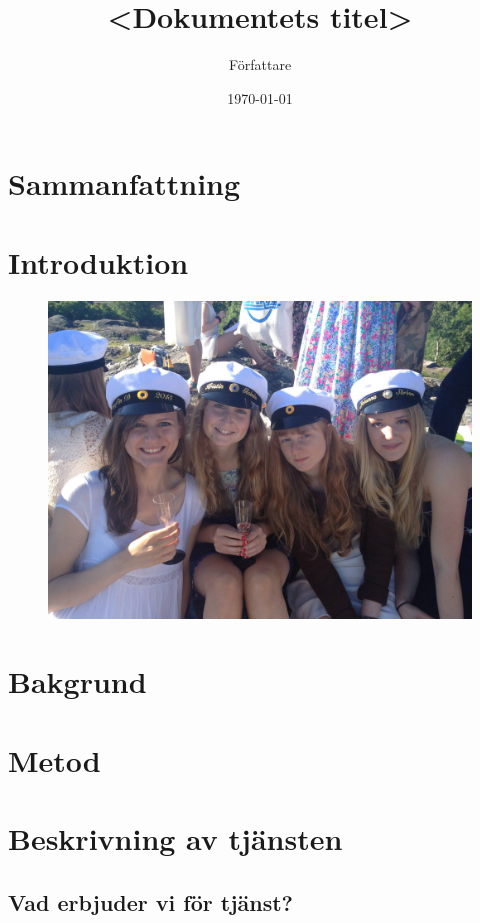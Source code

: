 \documentclass[10pt,a4paper,oneside]{article}
\title{<Dokumentets titel>}
\author{Författare}
\date{\today}
\begin{document}
\maketitle
\newpage

\section{Sammanfattning}
\cite{test1}
\newpage

\tableofcontents
\newpage

\section{Introduktion}

\begin{figure}[H]
	\includegraphics[scale=0.1]{pic.png}
\end{figure}

\newpage

\section{Bakgrund}
\newpage

\section{Metod}
\newpage

\section{Beskrivning av tjänsten}
\subsection{Vad erbjuder vi för tjänst?}
\end{document}
